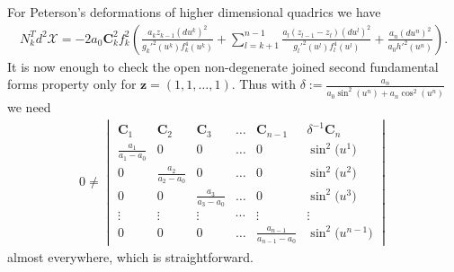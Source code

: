\documentclass[11pt]{article}
\begin{document}
For Peterson's deformations of higher dimensional quadrics we have
\begin{gather*}
N_k^Td^2\mathcal{X}=
-2a_0\mathbf{C}_k^2f_k^2\left(\frac{a_kz_{k-1}(du^k)^2}{g_k'^2(u^k)f_k^4(u^k)}
+\sum_{l=k+1}^{n-1}\frac{a_l(z_{l-1}-z_l)(du^l)^2}{g_l'^2(u^l)f_l^4(u^l)}
+\frac{a_n(du^n)^2}{a_0h'^2(u^n)}\right).
\end{gather*}
It is now enough to check the open non-degenerate joined second
fundamental forms property only for $\mathbf{z}=(1,1,\dots ,1)$. Thus
with $\delta:=\frac{a_n}{a_0\sin^2(u^n)+a_n\cos^2(u^n)}$ we need
\begin{gather*}
0\neq\begin{vmatrix}
\mathbf{C}_1&\mathbf{C}_2&\mathbf{C}_3&\dots &\mathbf{C}_{n-1}&\delta^{-1}\mathbf{C}_n\\
\frac{a_1}{a_1-a_0}&0&0&\dots &0&\sin^2\big(u^1\big)\\
0&\frac{a_2}{a_2-a_0}&0&\dots &0&\sin^2\big(u^2\big)\\
0&0&\frac{a_3}{a_3-a_0}&\dots &0&\sin^2\big(u^3\big)\\
\vdots&\vdots&\vdots&\cdots&\vdots&\vdots\\
0&0&0&\dots &\frac{a_{n-1}}{a_{n-1}-a_0}&\sin^2\big(u^{n-1}\big)\end{vmatrix}
\end{gather*}
almost everywhere, which is straightforward.
\end{document}
